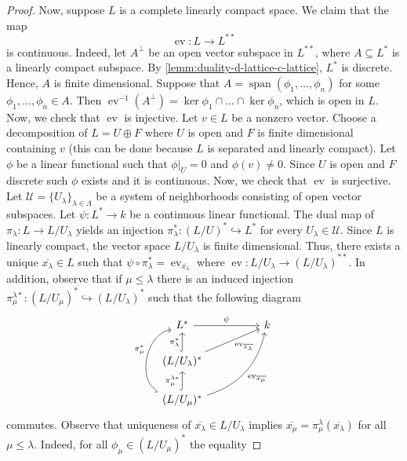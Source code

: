 \begin{proof}
	Now, suppose $L$ is a complete linearly compact space. We claim that the map 
	\[
		\operatorname{ev}\colon L \to L^{**}
	\]
	is continuous. Indeed, let $A^{\perp}$ be an open vector subspace in $L^{**}$, where $A \subseteq L^{*}$ is a linearly compact subspace. By \cref{lemm:duality-d-lattice-c-lattice}, $L^{*}$ is discrete. Hence, $A$ is finite dimensional. Suppose that $A = \operatorname{span}(\phi_{1},\ldots,\phi_{n})$ for some $\phi_{1},\ldots,\phi_{n} \in A$. Then $\operatorname{ev}^{-1}(A^{\perp}) = \ker \phi_{1} \cap \ldots \cap \ker \phi_{n}$, which is open in $L$. Now, we check that $\operatorname{ev}$ is injective. Let $v \in L$ be a nonzero vector. Choose a decomposition of $L = U \oplus F$ where $U$ is open and $F$ is finite dimensional containing $v$ (this can be done because $L$ is separated and linearly compact). Let $\phi$ be a linear functional such that $\phi\lvert_{U} = 0$ and $\phi(v) \neq 0$. Since $U$ is open and $F$ discrete such $\phi$ exists and it is continuous. Now, we check that $\operatorname{ev}$ is surjective. Let $\mathscr{U} = \{U_{\lambda}\}_{\lambda\in \Lambda}$ be a system of neighborhoods consisting of open vector subspaces. Let $\psi\colon L^{*} \to k$ be a continuous linear functional. The dual map of $\pi_{\lambda}\colon L \to L/U_{\lambda}$ yields an injection $\pi_{\lambda}^{*}\colon(L/U)^{*} \hookrightarrow L^{*}$ for every $U_{\lambda} \in \mathscr{U}$. Since $L$ is linearly compact, the vector space $L/U_{\lambda}$ is finite dimensional. Thus, there exists a unique $\overline{x_{\lambda}}\in L$ such that $\psi \circ \pi_{\lambda}^{*} = \operatorname{ev}_{\overline{x_{\lambda}}}$ where $\operatorname{ev}\colon L/U_{\lambda} \to (L/U_{\lambda})^{**}$. In addition, observe that if $\mu\leq \lambda $ there is an induced injection $\pi_{\mu}^{\lambda*}\colon(L/U_{\mu})^{*} \hookrightarrow (L/U_{\lambda})^{*}$ such that the following diagram
	\[
	\begin{tikzcd}
		L^{*} \arrow[rr, "\psi"] & & k \\
		(L/U_{\lambda})^{*} \arrow[u, hook, "\pi_{\lambda}^{*}"] \arrow[urr, swap, "\operatorname{ev}_{\overline{x_{\lambda}}}"] & & \\
		(L/U_{\mu})^{*} \arrow[u, hook, "\pi_{\mu}^{\lambda*}"] \arrow[uurr, swap, bend right, "\operatorname{ev}_{\overline{x_{\mu}}}"] \arrow[uu, bend left = 70, hook, "\pi_{\mu}^{*}"]& & 
	\end{tikzcd}
	\]
	commutes. Observe that uniqueness of $\overline{x_{\lambda}} \in L/U_{\lambda}$ implies $\overline{x_\mu} = \pi_{\mu}^{\lambda}(\overline{x_{\lambda}})$ for all $\mu \leq \lambda$. Indeed, for all $\phi_{\mu}\in(L/U_{\mu})^{*}$ the equality

\end{proof}
